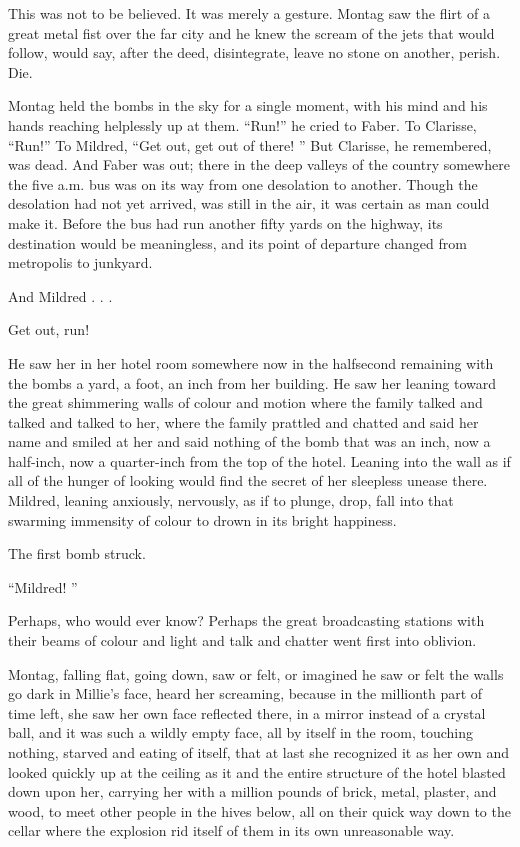 \documentclass[11pt,openany]{book}
\begin{document}
This was not to be believed. It was merely a gesture. Montag saw the flirt of a great metal fist over the far city and he knew the scream of the jets that would follow, would say, after the deed, disintegrate, leave no stone on another, perish. Die.

Montag held the bombs in the sky for a single moment, with his mind and his hands reaching helplessly up at them. ``Run!'' he cried to Faber. To Clarisse, ``Run!'' To Mildred, ``Get out, get out of there! '' But Clarisse, he remembered, was dead. And Faber was out; there in the deep valleys of the country somewhere the five a.m. bus was on its way from one desolation to another. Though the desolation had not yet arrived, was still in the air, it was certain as man could make it. Before the bus had run another fifty yards on the highway, its destination would be meaningless, and its point of departure changed from metropolis to junkyard.

And Mildred . . .

Get out, run!

He saw her in her hotel room somewhere now in the halfsecond remaining with the bombs a yard, a foot, an inch from her building. He saw her leaning toward the great shimmering walls of colour and motion where the family talked and talked and talked to her, where the family prattled and chatted and said her name and smiled at her and said nothing of the bomb that was an inch, now a half-inch, now a quarter-inch from the top of the hotel. Leaning into the wall as if all of the hunger of looking would find the secret of her sleepless unease there. Mildred, leaning anxiously, nervously, as if to plunge, drop, fall into that swarming immensity of colour to drown in its bright happiness.

The first bomb struck.

``Mildred! ''

Perhaps, who would ever know? Perhaps the great broadcasting stations with their beams of colour and light and talk and chatter went first into oblivion.

Montag, falling flat, going down, saw or felt, or imagined he saw or felt the walls go dark in Millie's face, heard her screaming, because in the millionth part of time left, she saw her own face reflected there, in a mirror instead of a crystal ball, and it was such a wildly empty face, all by itself in the room, touching nothing, starved and eating of itself, that at last she recognized it as her own and looked quickly up at the ceiling as it and the entire structure of the hotel blasted down upon her, carrying her with a million pounds of brick, metal, plaster, and wood, to meet other people in the hives below, all on their quick way down to the cellar where the explosion rid itself of them in its own unreasonable way.
\end{document}

